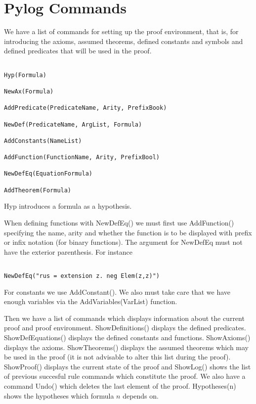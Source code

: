 \documentclass[a4paper,12pt,leqno]{article}
\numberwithin{equation}{section}
\begin{document}
\section*{Pylog Commands}

We have a list of commands for setting up the proof environment, that is, for introducing the axioms, assumed theorems, defined constants and symbols and defined predicates that will be used in the proof.

\begin{verbatim}
	
Hyp(Formula)	
	
NewAx(Formula)

AddPredicate(PredicateName, Arity, PrefixBook)

NewDef(PredicateName, ArgList, Formula)

AddConstants(NameList)

AddFunction(FunctionName, Arity, PrefixBool)

NewDefEq(EquationFormula)

AddTheorem(Formula)

\end{verbatim}

Hyp introduces a formula as a hypothesis.

When defining functions with NewDefEq() we must first use AddFunction() specifying the name, arity and whether the function is to be displayed with prefix or infix notation (for binary functions). The argument for NewDefEq must not have the exterior parenthesis. For instance

\begin{verbatim}

NewDefEq("rus = extension z. neg Elem(z,z)")

\end{verbatim}


 For constants we use AddConstant().
We also must take care that we have enough variables via the AddVariables(VarList) function.

Then we have a list of commands which displays information about the current proof and proof environment. ShowDefinitions()  displays the defined predicates. ShowDefEquations() displays the defined constants and functions. ShowAxioms() displays the axioms.  ShowTheorems() displays the assumed theorems which may be used in the proof (it is not advisable to alter this list during the proof). ShowProof() displays the current state of the proof and ShowLog() shows the list of previous succesful rule commands which constitute the proof. We also have a command Undo() which deletes the last element of the proof. Hypotheses(n) shows the hypotheses which formula $n$ depends on.
\end{document}
